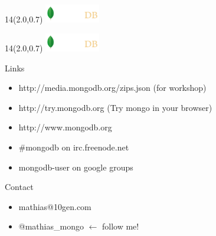 \documentclass{beamer}
\newcommand{\MongoLogo}{
\begin{textblock}{14}(2.0,0.7)
  \includegraphics[height=0.8cm]{logo-mongodb-ondark.png}
\end{textblock}
}
\begin{document}
\begin{frame}
  \MongoLogo
  \center
\end{frame}

\begin{frame}
  \MongoLogo


  \begin{block}{Links}
  \begin{itemize}
    \item http://media.mongodb.org/zips.json (for workshop)
    \item http://try.mongodb.org (Try mongo in your browser)
    \item http://www.mongodb.org
    \item \#mongodb on irc.freenode.net
    \item mongodb-user on google groups
  \end{itemize}
  \end{block}

  \begin{block}{Contact}
  \begin{itemize}
    \item mathias@10gen.com
    \item @mathias\_mongo ${\leftarrow}$ follow me!
  \end{itemize}
  \end{block}
\end{frame}
\end{document}
